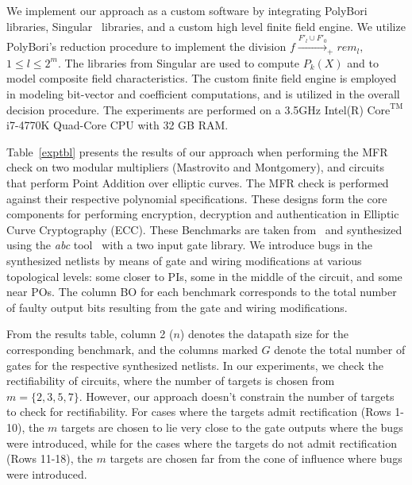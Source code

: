 
We implement our approach as a custom software by integrating PolyBori~\cite{pbori:JSC09} libraries,
{\sc Singular}~\cite{DGPS_410} libraries, and a custom high level finite field engine.
We utilize PolyBori’s reduction procedure to implement the division 
$f\xrightarrow{F'_l\cup F'_{0}}_+ rem_l,$ $ 1 \leq l \leq 2^m$. The libraries from {\sc Singular} 
are used to compute $P_k(X)$ and to model composite field characteristics.
The custom finite field engine is employed in modeling bit-vector and coefficient computations,
and is utilized in the overall decision procedure. The experiments are performed on a 3.5GHz 
Intel(R) $\text{Core}^{\text{TM}}$ i7-4770K Quad-Core CPU with 32 GB RAM.

Table~\ref{exptbl} presents the results of our approach when 
performing the MFR check on two modular multipliers (Mastrovito and Montgomery), and circuits
that perform Point Addition over elliptic curves. The MFR check is performed against 
their respective polynomial specifications. 
These designs form the core components for performing encryption, 
decryption and authentication in Elliptic Curve Cryptography (ECC).
These Benchmarks are taken from~\cite{lv:tcad2013} and synthesized using the {\it abc} 
tool~\cite{abc} with a two input gate library.
We introduce bugs in the synthesized netlists by means of gate and wiring 
modifications at various topological levels: some closer to PIs, 
some in the middle of the circuit, and some near POs.
The column BO for each benchmark corresponds to the total number of faulty output bits 
resulting from the gate and wiring modifications. 

From the results table, column 2 ($n$) denotes the datapath size for the corresponding benchmark,
and the columns marked $G$ denote the total number of gates for the respective synthesized netlists.
 In our experiments, we check the rectifiability of circuits, where the number of targets
is chosen from $m=\{2,3,5,7\}$. However, our approach doesn't constrain the number 
of targets to check for rectifiability. For cases where the targets admit rectification 
(Rows 1-10), the $m$ targets are chosen to lie very close to the gate outputs 
where the bugs were introduced, while for the cases where the targets 
do not admit rectification (Rows 11-18), the $m$ targets are chosen far 
from the cone of influence where bugs were introduced.

